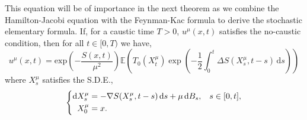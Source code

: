 \documentclass[a4paper,12pt,draft]{report}
\theoremstyle{remark}
\theoremstyle{definition}
\begin{document}
This equation will be of importance in the next theorem as we combine the Hamilton-Jacobi equation with the Feynman-Kac formula to derive the stochastic elementary formula.
\theorem
{
If, for a caustic time $T > 0$, $u^{\mu}(x, t)$ satisfies the no-caustic condition, then for all $t \in [0, T)$ we have,
\begin{equation}
u^\mu(x, t) = \mathrm{exp}\left(-\frac{S(x, t)}{\mu^2}\right)\mathbb{E}\left(T_{0}(X^{\mu}_{t})\exp\left(-\frac{1}{2}\int_0^t \Delta S(X^{\mu}_{s}, t - s)\,\mathrm{d}s\right)\right) \label{SEF}
\end{equation}
where $X^{\mu}_{s}$ satisfies the S.D.E.,
\begin{equation}
\left\{
\begin{aligned}
\mathrm{d}X^{\mu}_{s} & = -\nabla S(X^{\mu}_{s}, t - s)\,\mathrm{d}s + \mu\,\mathrm{d}B_{s}, \hspace{0.3cm} s \in [0, t], \\ \label{Diffusion}
\hspace{0.2cm}X^{\mu}_{0} & = x.
\end{aligned}
\right.
\end{equation}
}
\proof
\end{document}
